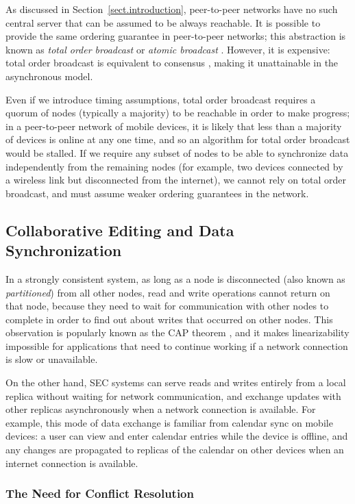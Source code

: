 As discussed in Section~\ref{sect.introduction}, peer-to-peer networks have no such central server
that can be assumed to be always reachable. It is possible to provide the same ordering guarantee in
peer-to-peer networks; this abstraction is known as \emph{total order broadcast} or \emph{atomic
broadcast} \cite{Cachin:2011wt}. However, it is expensive: total order broadcast is equivalent to
consensus \cite{Chandra:1996cp}, making it unattainable in the asynchronous model.

Even if we introduce timing assumptions, total order broadcast requires a quorum of nodes (typically
a majority) to be reachable in order to make progress; in a peer-to-peer network of mobile devices,
it is likely that less than a majority of devices is online at any one time, and so an algorithm for
total order broadcast would be stalled. If we require any subset of nodes to be able to synchronize
data independently from the remaining nodes (for example, two devices connected by a wireless link
but disconnected from the internet), we cannot rely on total order broadcast, and must assume weaker
ordering guarantees in the network.

\subsection{Collaborative Editing and Data Synchronization}\label{sect.datasync}

In a strongly consistent system, as long as a node is disconnected (also known as
\emph{partitioned}) from all other nodes, read and write operations cannot return on that node,
because they need to wait for communication with other nodes to complete in order to find out about
writes that occurred on other nodes. This observation is popularly known as the CAP theorem
\cite{Gilbert:2002il}, and it makes linearizability impossible for applications that need to
continue working if a network connection is slow or unavailable.

On the other hand, SEC systems can serve reads and writes entirely from a local replica without
waiting for network communication, and exchange updates with other replicas asynchronously when a
network connection is available. For example, this mode of data exchange is familiar from calendar
sync on mobile devices: a user can view and enter calendar entries while the device is offline, and
any changes are propagated to replicas of the calendar on other devices when an internet connection
is available.

\subsubsection{The Need for Conflict Resolution}

